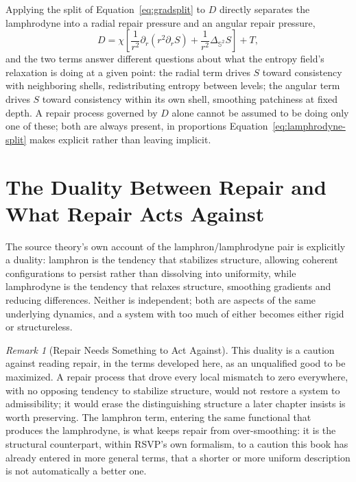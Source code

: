 \documentclass[11pt,fleqn]{book}
\numberwithin{equation}{chapter}
\theoremstyle{plain}
\theoremstyle{definition}
\theoremstyle{remark}
\newtheorem{remark}[theorem]{Remark}
\newcommand{\Sphere}{\mathbb{S}^{2}}
\begin{document}
Applying the split of Equation~\eqref{eq:gradsplit} to \(D\) directly separates the lamphrodyne into a radial repair pressure and an angular repair pressure,
\begin{equation}
D = \chi\left[\frac{1}{r^2}\partial_r\!\left(r^2\partial_rS\right) + \frac{1}{r^2}\Delta_{\Sphere}S\right] + T,
\label{eq:lamphrodyne-split}
\end{equation}
and the two terms answer different questions about what the entropy field's relaxation is doing at a given point: the radial term drives \(S\) toward consistency with neighboring shells, redistributing entropy between levels; the angular term drives \(S\) toward consistency within its own shell, smoothing patchiness at fixed depth. A repair process governed by \(D\) alone cannot be assumed to be doing only one of these; both are always present, in proportions Equation~\eqref{eq:lamphrodyne-split} makes explicit rather than leaving implicit.

\section{The Duality Between Repair and What Repair Acts Against}

The source theory's own account of the lamphron/lamphrodyne pair is explicitly a duality: lamphron is the tendency that stabilizes structure, allowing coherent configurations to persist rather than dissolving into uniformity, while lamphrodyne is the tendency that relaxes structure, smoothing gradients and reducing differences. Neither is independent; both are aspects of the same underlying dynamics, and a system with too much of either becomes either rigid or structureless.

\begin{remark}[Repair Needs Something to Act Against]
This duality is a caution against reading repair, in the terms developed here, as an unqualified good to be maximized. A repair process that drove every local mismatch to zero everywhere, with no opposing tendency to stabilize structure, would not restore a system to admissibility; it would erase the distinguishing structure a later chapter insists is worth preserving. The lamphron term, entering the same functional that produces the lamphrodyne, is what keeps repair from over-smoothing: it is the structural counterpart, within RSVP's own formalism, to a caution this book has already entered in more general terms, that a shorter or more uniform description is not automatically a better one.
\end{remark}
\end{document}
